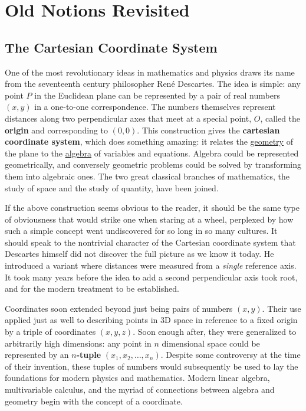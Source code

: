 \documentclass[../master.tex]{subfiles}
\begin{document}
\chapter{Old Notions Revisited}\thispagestyle{empty}
\section{The Cartesian Coordinate System} %
\label{sec:Cartesian}
	
	One of the most revolutionary ideas in mathematics and physics draws its name from the seventeenth century philosopher Ren\'{e} Descartes. The idea is simple: any point $P$ in the Euclidean plane can be represented by a pair of real numbers $(x,y)$ in a one-to-one correspondence. The numbers themselves represent distances along two perpendicular axes that meet at a special point, $O$, called the \textbf{origin} and corresponding to $(0,0)$. This construction gives the \textbf{cartesian coordinate system}, which does something amazing: it relates the \underline{geometry} of the plane to the \underline{algebra} of variables and equations. Algebra could be represented geometrically, and conversely geometric problems could be solved by transforming them into algebraic ones. The two great classical branches of mathematics, the study of space and the study of quantity, have been joined.
	
	
	If the above construction seems obvious to the reader, it should be the same type of obviousness that would strike one when staring at a wheel, perplexed by how such a simple concept went undiscovered for so long in so many cultures. It should speak to the nontrivial character of the Cartesian coordinate system that Descartes himself did not discover the full picture as we know it today. He introduced a variant where distances were measured from a \emph{single} reference axis. It took many years before the idea to add a second perpendicular axis took root, and for the modern treatment to be established.
	
	
	Coordinates soon extended beyond just being pairs of numbers $(x,y)$. Their use applied just as well to describing points in 3D space in reference to a fixed origin by a triple of coordinates $(x,y,z)$. Soon enough after, they were generalized to arbitrarily high dimensions: any point in $n$ dimensional space could be represented by an \textbf{$n$-tuple} $(x_1, x_2, \dots, x_n)$. Despite some controversy at the time of their invention, these tuples of numbers would subsequently be used to lay the foundations for modern physics and mathematics. Modern linear algebra, multivariable calculus, and the myriad of connections between algebra and geometry begin with the concept of a coordinate.
	
\end{document}
